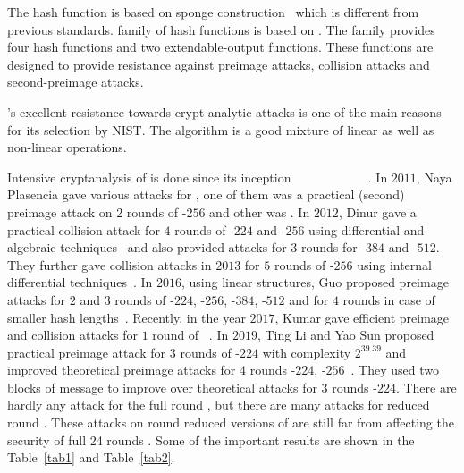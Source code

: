 The \KECCAK{} hash function is based on sponge construction~\cite{bertoni2011cryptographic} which is different from previous \SHA{} standards.  family of hash functions is based on \Keccak{}. The  family provides four hash functions and two extendable-output functions. These functions are designed to provide resistance against preimage attacks, collision attacks and second-preimage attacks.

\Keccak{}'s excellent resistance towards crypt-analytic attacks is one of the main reasons for its selection by NIST. The algorithm is a good mixture of linear as well as non-linear operations.

Intensive cryptanalysis of \KECCAK{} is done since its inception ~\cite{bernstein2010second}~\cite{naya2011practical}~\cite{dinur2012new}~\cite{dinur2013collision}~\cite{morawiecki2013sat}
~\cite{dinur2014improved}~\cite{chang20141st}~\cite{guo2016linear}~\cite{qiao2017new}~\cite{song2017non}~\cite{kumar2018cryptanalysis}. In $2011$, Naya Plasencia \etal gave various attacks for \KECCAK{}, one of them was a practical (second) preimage attack on 2 rounds of \KECCAK-$256$ and other was . In $2012$, Dinur \etal gave a practical collision attack for $4$ rounds of \KECCAK-$224$ and \KECCAK-$256$ using differential and algebraic techniques~\cite{dinur2012new} and also provided attacks for $3$ rounds for \KECCAK-$384$ and \KECCAK-$512$. They further gave collision attacks in $2013$ for $5$ rounds of \KECCAK-$256$ using internal differential techniques~\cite{dinur2013collision}. In $2016$, using linear structures, Guo \etal proposed preimage attacks for $2$ and $3$ rounds of \KECCAK-$224$, \KECCAK-$256$, \KECCAK-$384$, \KECCAK-$512$ and for $4$ rounds in case of smaller hash lengths~\cite{guo2016linear}. Recently, in the year $2017$, Kumar \etal gave efficient preimage and collision attacks for $1$ round of \KECCAK~\cite{kumar2018cryptanalysis}. In $2019$, Ting Li and Yao Sun proposed practical preimage attack for $3$ rounds of \KECCAK-$224$ with complexity $2^{39.39}$ and improved theoretical preimage attacks for $4$ rounds \KECCAK-$224$, \KECCAK-$256$~\cite{lipreimage}. They used two blocks of message to improve over theoretical attacks for $3$ rounds \KECCAK-$224$. There are hardly any attack for the full round \KECCAK{}, but there are many attacks for reduced round \Keccak{}. These attacks on round reduced versions of \KECCAK{} are still far from affecting the security of full 24 rounds \KECCAK{}. Some of the important results are shown in the Table~\ref{tab1} and Table~\ref{tab2}.


